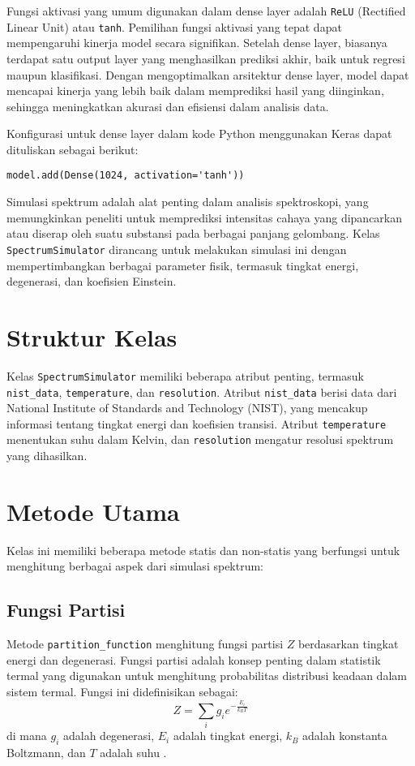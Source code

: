 \par Fungsi aktivasi yang umum digunakan dalam dense layer adalah \texttt{ReLU} (Rectified Linear Unit) atau \texttt{tanh}. Pemilihan fungsi aktivasi yang tepat dapat mempengaruhi kinerja model secara signifikan. Setelah dense layer, biasanya terdapat satu output layer yang menghasilkan prediksi akhir, baik untuk regresi maupun klasifikasi. Dengan mengoptimalkan arsitektur dense layer, model dapat mencapai kinerja yang lebih baik dalam memprediksi hasil yang diinginkan, sehingga meningkatkan akurasi dan efisiensi dalam analisis data.

\par Konfigurasi untuk dense layer dalam kode Python menggunakan Keras dapat dituliskan sebagai berikut:
    
\lstinline[]|model.add(Dense(1024, activation='tanh'))|
  

\par Simulasi spektrum adalah alat penting dalam analisis spektroskopi, yang memungkinkan peneliti untuk memprediksi intensitas cahaya yang dipancarkan atau diserap oleh suatu substansi pada berbagai panjang gelombang. Kelas \texttt{SpectrumSimulator} dirancang untuk melakukan simulasi ini dengan mempertimbangkan berbagai parameter fisik, termasuk tingkat energi, degenerasi, dan koefisien Einstein.

\section{Struktur Kelas}
\par Kelas \texttt{SpectrumSimulator} memiliki beberapa atribut penting, termasuk \texttt{nist\_data}, \texttt{temperature}, dan \texttt{resolution}. Atribut \texttt{nist\_data} berisi data dari National Institute of Standards and Technology (NIST), yang mencakup informasi tentang tingkat energi dan koefisien transisi. Atribut \texttt{temperature} menentukan suhu dalam Kelvin, dan \texttt{resolution} mengatur resolusi spektrum yang dihasilkan.

\section{Metode Utama}
\par Kelas ini memiliki beberapa metode statis dan non-statis yang berfungsi untuk menghitung berbagai aspek dari simulasi spektrum:

\subsection{Fungsi Partisi}
\par Metode \texttt{partition\_function} menghitung fungsi partisi $Z$ berdasarkan tingkat energi dan degenerasi. Fungsi partisi adalah konsep penting dalam statistik termal yang digunakan untuk menghitung probabilitas distribusi keadaan dalam sistem termal. Fungsi ini didefinisikan sebagai:
\begin{equation}
    Z = \sum_{i} g_i e^{-\frac{E_i}{k_B T}}
\end{equation}
di mana $g_i$ adalah degenerasi, $E_i$ adalah tingkat energi, $k_B$ adalah konstanta Boltzmann, dan $T$ adalah suhu \citep{pathria2011}.

